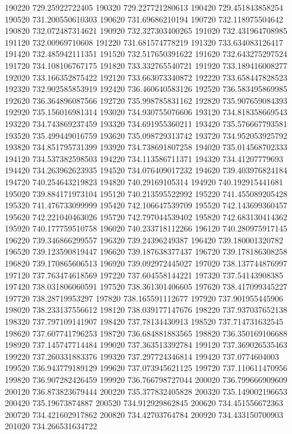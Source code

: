 {190220 729.25922722405
190320 729.227721280613
190420 729.451843858254
190520 731.200550610303
190620 731.69686210194
190720 732.118975504642
190820 732.072487314621
190920 732.327303400265
191020 732.431964708985
191120 732.00969710608
191220 731.681574778219
191320 733.634083126417
191420 732.485942111351
191520 732.517650391622
191620 732.643275297524
191720 734.108106767175
191820 733.332765540721
191920 733.189416008277
192020 733.166352875422
192120 733.663073340872
192220 733.658447828523
192320 732.902585853919
192420 736.460640583126
192520 736.583495869985
192620 736.364896087566
192720 735.998785831162
192820 735.907659084393
192920 735.156016981314
193020 734.930755076606
193120 734.818358669543
193220 734.743869237459
193320 734.691955360211
193420 735.576667793581
193520 735.499449016759
193620 735.098729313742
193720 734.952053925792
193820 734.851795731399
193920 734.738691807258
194020 735.014568702333
194120 734.537382598503
194220 734.113586711371
194320 734.41207779693
194420 734.263962623935
194520 734.076409017232
194620 739.403976824184
194720 740.254643219823
194820 740.29169105314
194920 740.192915441681
195020 739.884171973104
195120 740.213595522992
195220 741.455089205428
195320 741.476733099999
195420 742.106647539709
195520 742.143699360457
195620 742.221040463026
195720 742.797044539402
195820 742.683130414362
195920 740.177759510758
196020 740.233718112266
196120 740.280975917145
196220 739.346866299557
196320 739.24396249387
196420 739.180001320782
196520 739.123590819447
196620 739.187638377437
196720 739.178186308258
196820 739.170865606513
196920 739.092972445027
197020 738.137744876997
197120 737.763474618569
197220 737.604558144221
197320 737.54143908385
197420 738.031806060591
197520 738.361301406605
197620 738.417099345227
197720 738.28719953297
197820 738.165591112677
197920 737.901955445906
198020 738.233137556612
198120 738.039177147676
198220 737.937037652138
198320 737.797109141907
198420 737.78134430913
198520 737.714731632545
198620 737.607741796253
198720 736.684881883565
198820 736.350169106688
198920 737.145747714484
199020 737.363513392784
199120 737.369026535463
199220 737.260331883376
199320 737.297724346814
199420 737.0774604003
199520 736.943779189129
199620 737.073945621125
199720 737.110611470956
199820 736.907282426459
199920 736.766798727044
200020 736.799666909609
200120 736.873823679444
200220 735.377832405828
200320 735.149002196653
200420 735.19673874887
200520 734.912929862845
200620 734.451556672363
200720 734.421602917862
200820 734.42703764784
200920 734.433150700903
201020 734.266531634722
}
